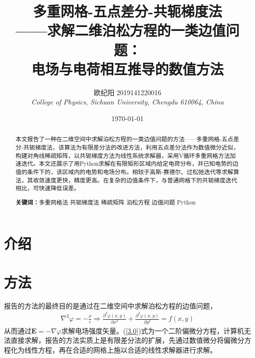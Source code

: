 \documentclass{article} %
\title{多重网格-五点差分-共轭梯度法\\——求解二维泊松方程的一类边值问题：\\电场与电荷相互推导的数值方法} %
\author{欧纪阳 2019141220016\\ \textit{College of Physics, Sichuan University, Chengdu 610064, China}} %
\date{\today} %
\renewcommand{\vec}[1]{\boldsymbol{#1}} %
\begin{document}
\maketitle %
\begin{abstract} %
    \quad 本文报告了一种在二维空间中求解泊松方程的一类边值问题的方法——多重网格-五点差分-共轭梯度法，该算法为有限差分法的改进方法，利用五点差分法作为数值微分近似，构建对角线稀疏矩阵，以共轭梯度方法为线性系统求解器，采用V循环多重网格方法加速迭代。本文还展示了用Python求解在有限矩形区域内给定电荷分布，并已知电势的边值的条件下的，该区域内的电势和电场分布。相较于高斯-赛德尔、过松弛迭代等求解算法，其收敛速度更快，精度更高。在复杂的边值条件下，与普通网格下的共轭梯度迭代相比，可快速降低误差。

    \textbf{关键词：}多重网格法 \quad 共轭梯度法 \quad 稀疏矩阵 \quad 泊松方程 \quad 边值问题 \quad Python
\end{abstract}

\tableofcontents %
\thispagestyle{empty} %

\newpage

\section{介绍}

\section{方法}
报告的方法的最终目的是通过在二维空间中求解泊松方程的边值问题，
\begin{align}
    \nabla^2 \varphi = -\frac{\rho}{\varepsilon} \Rightarrow \frac{\partial^2 \varphi (x,y)}{\partial x^2}+\frac{\partial^2 \varphi (x,y)}{\partial y^2}=f(x,y) \label{3.0}
\end{align}
从而通过$\vec{E}=-\nabla \varphi$求解电场强度矢量。(\ref{3.0})式为一个二阶偏微分方程，计算机无法直接求解，报告的方法实质上是有限差分法的扩展，先通过数值微分将偏微分方程化为线性方程，再在合适的网格上施以合适的线性求解器进行求解。
\end{document}
